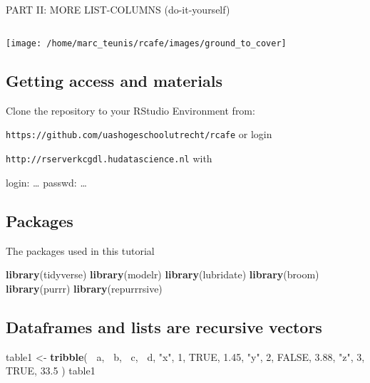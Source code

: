 \documentclass[]{article}
\newenvironment{Shaded}{\begin{snugshade}}{\end{snugshade}}
\newcommand{\KeywordTok}[1]{\textcolor[rgb]{0.13,0.29,0.53}{\textbf{#1}}}
\newcommand{\DecValTok}[1]{\textcolor[rgb]{0.00,0.00,0.81}{#1}}
\newcommand{\FloatTok}[1]{\textcolor[rgb]{0.00,0.00,0.81}{#1}}
\newcommand{\StringTok}[1]{\textcolor[rgb]{0.31,0.60,0.02}{#1}}
\newcommand{\OtherTok}[1]{\textcolor[rgb]{0.56,0.35,0.01}{#1}}
\newcommand{\OperatorTok}[1]{\textcolor[rgb]{0.81,0.36,0.00}{\textbf{#1}}}
\newcommand{\NormalTok}[1]{#1}
\begin{document}
PART II: MORE LIST-COLUMNS (do-it-yourself)

\subsection{}\label{section}

\texttt{[image: /home/marc\_teunis/rcafe/images/ground\_to\_cover]}

\subsection{Getting access and
materials}\label{getting-access-and-materials}

Clone the repository to your RStudio Environment from:

\texttt{https://github.com/uashogeschoolutrecht/rcafe} or login

\texttt{http://rserverkcgdl.hudatascience.nl} with

login: \ldots{} passwd: \ldots{}

\subsection{Packages}\label{packages}

The packages used in this tutorial

\begin{Shaded}
\begin{Highlighting}[]
\KeywordTok{library}\NormalTok{(tidyverse)}
\KeywordTok{library}\NormalTok{(modelr)}
\KeywordTok{library}\NormalTok{(lubridate)}
\KeywordTok{library}\NormalTok{(broom)}
\KeywordTok{library}\NormalTok{(purrr)}
\KeywordTok{library}\NormalTok{(repurrrsive)}
\end{Highlighting}
\end{Shaded}

\subsection{Dataframes and lists are recursive
vectors}\label{dataframes-and-lists-are-recursive-vectors}

\begin{Shaded}
\begin{Highlighting}[]
\NormalTok{table1 <-}\StringTok{ }\KeywordTok{tribble}\NormalTok{(}
  \OperatorTok{~}\NormalTok{a,    }\OperatorTok{~}\NormalTok{b,  }\OperatorTok{~}\NormalTok{c,     }\OperatorTok{~}\NormalTok{d, }
  \StringTok{"x"}\NormalTok{,   }\DecValTok{1}\NormalTok{,   }\OtherTok{TRUE}\NormalTok{,   }\FloatTok{1.45}\NormalTok{, }
  \StringTok{"y"}\NormalTok{,   }\DecValTok{2}\NormalTok{,   }\OtherTok{FALSE}\NormalTok{,  }\FloatTok{3.88}\NormalTok{,}
  \StringTok{"z"}\NormalTok{,   }\DecValTok{3}\NormalTok{,   }\OtherTok{TRUE}\NormalTok{,   }\FloatTok{33.5}
\NormalTok{  ) }
\NormalTok{table1}
\end{Highlighting}
\end{Shaded}
\end{document}
